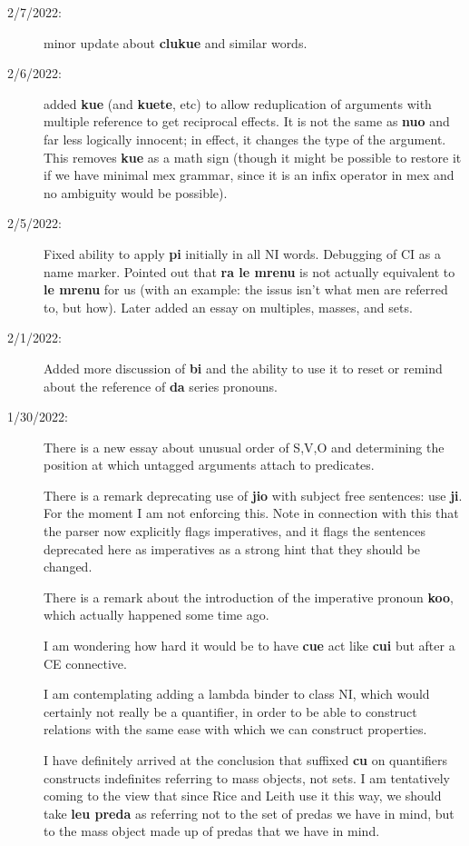 \documentclass[12pt]{book}
\begin{document}
\begin{description}
\item[2/7/2022:]  minor update about {\bf clukue} and similar words.

\item[2/6/2022:]  added {\bf kue} (and {\bf kuete}, etc) to allow reduplication of arguments with multiple reference to get reciprocal effects.  It is not the same as {\bf nuo} and far less logically innocent; in effect, it changes the type of the argument.  This removes {\bf kue} as a math sign (though it might be possible to restore it if we have minimal mex grammar,
since it is an infix operator in mex and no ambiguity would be possible).

\item[2/5/2022:]  Fixed ability to apply {\bf pi} initially in all NI words.  Debugging of CI as a name marker.  Pointed out that {\bf ra le mrenu} is not actually equivalent to {\bf le mrenu} for us (with an example:  the issus isn't what men are referred to, but how).  Later added an essay on multiples, masses, and sets.

\item[2/1/2022:]  Added more discussion of {\bf bi} and the ability to use it to reset or remind about the reference of {\bf da} series pronouns.

\item[1/30/2022:]  There is a new essay about unusual order of S,V,O and determining the position at which untagged arguments attach to predicates.

There is a remark deprecating use of {\bf jio} with subject free sentences:  use {\bf ji}.  For the moment I am not enforcing this.  Note in connection with this that the parser now explicitly flags imperatives, and it flags the sentences deprecated here as imperatives as a strong hint that they should be changed.

There is a remark about the introduction of the imperative pronoun {\bf koo}, which actually happened some time ago.

I am wondering how hard it would be to have {\bf cue} act like {\bf cui} but after a CE connective.

I am contemplating adding a lambda binder to class NI, which would certainly not really be a quantifier, in order to be able to construct relations with the same ease with which we can construct properties.

I have definitely arrived at the conclusion that suffixed {\bf cu} on quantifiers constructs indefinites referring to mass objects, not sets.  I am tentatively coming to the view that since Rice and Leith use it this way, we should take {\bf leu preda} as referring not to the set of predas we have in mind, but to the mass object made up of predas that we have in mind.


\end{description}
\end{document}
